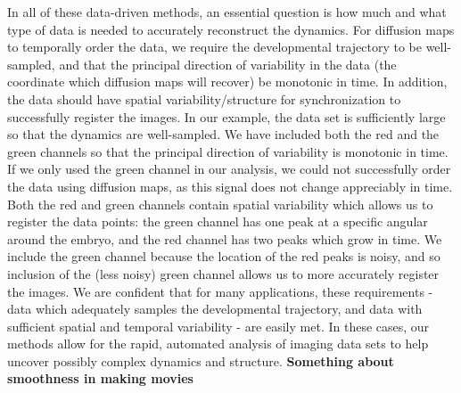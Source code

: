\documentclass{pnastwo}
\begin{document}
\begin{article}
In all of these data-driven methods, an essential question is how much and what type of data is needed to accurately reconstruct the dynamics.
%
For diffusion maps to temporally order the data, we require the developmental trajectory to be well-sampled, and that the principal direction of variability in the data (the coordinate which diffusion maps will recover) be monotonic in time.
%
In addition, the data should have spatial variability/structure for synchronization to successfully register the images.
%
In our example, the data set is sufficiently large so that the dynamics are well-sampled.
%
We have included both the red and the green channels so that the principal direction of variability is monotonic in time.
%
If we only used the green channel in our analysis, we could not successfully order the data using diffusion maps, as this signal does not change appreciably in time.
%
Both the red and green channels contain spatial variability which allows us to register the data points: the green channel has one peak at a specific angular around the embryo, and the red channel has two peaks which grow in time.
%
We include the green channel because the location of the red peaks is noisy, and so inclusion of the (less noisy) green channel allows us to more accurately register the images.
%
%
%
%
%
%
%
We are confident that for many applications, these requirements - data which adequately samples the developmental trajectory, and data with sufficient spatial and temporal variability - are easily met.
%
In these cases, our methods allow for the rapid, automated analysis of imaging data sets to help uncover possibly complex dynamics and structure.
{\bf Something about smoothness in making movies}
%


\end{article}
\end{document}
